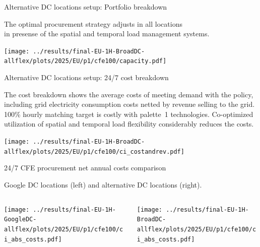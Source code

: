 \begin{frame}{Alternative DC locations setup: Portfolio breakdown}

  \centering
  {\footnotesize
  The optimal procurement strategy adjusts in all locations \\ 
  in presense of the \alert{spatial} and \alert{temporal} load management systems. 
  }

\texttt{[image: ../results/final-EU-1H-BroadDC-allflex/plots/2025/EU/p1/cfe100/capacity.pdf]}

\end{frame}


\begin{frame}{Alternative DC locations setup: 24/7 cost breakdown}

  \centering
  {\footnotesize
  The \alert{cost breakdown} shows the average costs of meeting demand with the policy, including grid electricity consumption costs netted by revenue selling to the grid.
  100\% hourly matching target is costly with palette~1 technologies. Co-optimized utilization of spatial and temporal load flexibility \alert{considerably reduces} the costs.
  }

\vspace{-0.2cm}   
\texttt{[image: ../results/final-EU-1H-BroadDC-allflex/plots/2025/EU/p1/cfe100/ci\_costandrev.pdf]}

\end{frame}


\begin{frame}{24/7 CFE procurement net annual costs comparison}

  \centering
  {\footnotesize
  Google DC locations (left) and alternative DC locations (right).
  }
  \vspace{.5cm}
  
  \begin{columns}
  \begin{column}{7cm}
  \centering
  \texttt{[image: ../results/final-EU-1H-GoogleDC-allflex/plots/2025/EU/p1/cfe100/ci\_abs\_costs.pdf]}
  \end{column}
  
  \begin{column}{8cm}
    \centering
    \texttt{[image: ../results/final-EU-1H-BroadDC-allflex/plots/2025/EU/p1/cfe100/ci\_abs\_costs.pdf]}
    \end{column}
  \end{columns}
  
  
\end{frame}


